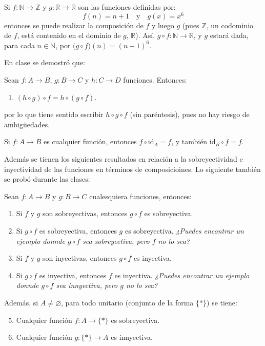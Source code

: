 \documentclass[letterpaper,DIV=14,headsepline,12pt]{scrartcl}
\newcommand{\id}{\mathrm{id}}
\renewcommand{\emptyset}{\varnothing}
\begin{document}
    \begin{ejemplo}
        Si $f:\mathbb{N} \to \mathbb{Z}$ y $g:\mathbb{R} \to \mathbb{R}$ son las funciones definidas por:
        \[ f(n)=n+1 \quad \text{y} \quad g(x)=x^6 \]
        entonces se puede realizar la composición de $f$ y luego $g$ (pues $\mathbb{Z}$, un codominio de $f$, está contenido en el dominio de $g$, $\mathbb{R}$). Así, $g \circ f : \mathbb{N} \to \mathbb{R}$, y $g$ estará dada, para cada $n \in \mathbb{N}$, por $\big( g \circ f \big) (n) = (n+1)^6$.
    \end{ejemplo}

    En clase se demostró que:
    \begin{teorema}
        Sean $f: A \to B$, $g: B \to C$ y $h: C \to D$ funciones. Entonces:
        \begin{enumerate}
            \item $(h \circ g) \circ f = h \circ (g \circ f)$.
        \end{enumerate}

        por lo que tiene sentido escribir $h \circ g \circ f$ (sin paréntesis), pues no hay riesgo de ambigüedades.
    \end{teorema}

    \begin{teorema}
        Si $f:A \to B$ es cualquier función, entonces $f \circ \id_A = f$, y también $\id_B \circ f = f$.
    \end{teorema}

    Además se tienen los siguientes resultados en relación a la sobreyectividad e inyectividad de las funciones en términos de composicioines. Lo siguiente también se probó durante las clases:
    
    \begin{teorema}
        Sean $f: A \to B$ y $g: B \to C$ cualesquiera funciones, entonces:
        \begin{enumerate}
            \item Si $f$ y $g$ son sobreyectivas, entonces $g \circ f$ es sobreyectiva.
            \item Si $g \circ f$ es sobreyectiva, entonces $g$ es sobreyectiva. \textit{¿Puedes encontrar un ejemplo donnde $g \circ f$ sea sobreyectiva, pero $f$ no lo sea?}
            \item Si $f$ y $g$ son inyectivas, entonces $g \circ f$ es inyectiva.
            \item Si $g \circ f$ es inyectiva, entonces $f$ es inyectiva. \textit{¿Puedes encontrar un ejemplo donnde $g \circ f$ sea innyectiva, pero $g$ no lo sea?}
        \end{enumerate}

        Además, si $A\neq \emptyset$, para todo unitario (conjunto de la forma $\{*\}$) se tiene:
        \begin{enumerate}\setcounter{enumi}{4}
            \item Cualquier función $f:A \to \{*\}$ es sobreyectiva.
            \item Cualquier función $g:\{*\} \to A$ es innyectiva.
        \end{enumerate}        
    \end{teorema}
\end{document}

